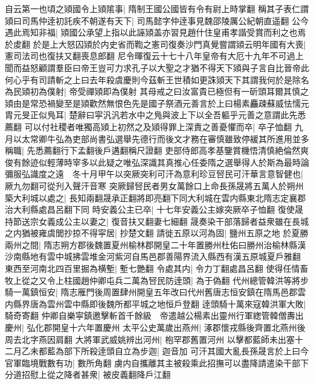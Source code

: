 自云第一也頃之熲國令上熲隂事|{
	隋制王國公國皆有令有尉上時掌翻}
稱其子表仁謂熲曰司馬仲逹初託疾不朝遂有天下|{
	司馬懿字仲逹事見魏邵陵厲公紀朝直遥翻}
公今遇此焉知非福|{
	熲國公承望上指以此誣熲盖亦習見趙什住皇甫孝諧受賞而利之也焉於䖍翻}
於是上大怒囚熲於内史省而鞫之憲司復奏沙門真覺嘗謂熲云明年國有大喪|{
	憲司法司也復扶又翻喪息郎翻}
尼令暉復云十七十八年皇帝有大厄十九年不可過上聞而益怒顧謂羣臣曰帝王豈可力求孔子以大聖之才猶不得天下熲與子言自比晉帝此何心乎有司請斬之上曰去年殺虞慶則今茲斬王世積如更誅熲天下其謂我何於是除名為民熲初為僕射|{
	帝受禪熲即為僕射}
其母戒之曰汝富貴已極但有一斫頭耳爾其慎之熲由是常恐禍變至是熲歡然無恨色先是國子祭酒元善言於上曰楊素麤疎蘇威怯懦元胄元旻正似鳬耳|{
	楚辭曰寜汎汎若水中之鳬與波上下以全吾軀乎元善之意謂此先悉薦翻}
可以付社稷者唯獨高熲上初然之及熲得罪上深責之善憂懼而卒|{
	卒子恤翻}
九月以太常卿牛弘為吏部尚書弘選舉先德行而後文才務在審慎雖致停緩其所進用並多稱職|{
	先悉薦翻行下孟翻後戶遘翻稱尺證翻}
吏部侍郎高孝基鑒賞機悟清慎絶倫然爽俊有餘迹似輕薄時宰多以此疑之唯弘深識其真推心任委隋之選舉得人於斯為最時論彌服弘識度之遠　冬十月甲午以突厥突利可汗為意利珍豆唘民可汗華言意智健也|{
	厥九勿翻可從刋入聲汗音寒}
突厥歸唘民者男女萬餘口上命長孫晟將五萬人於朔州築大利城以處之|{
	長知兩翻晟承正翻將即亮翻下同大利城在雲内縣東北隋志定襄郡治大利縣處昌呂翻下同}
時安義公主已卒|{
	十七年安義公主嫁突厥卒子恤翻}
復使晟持節送宗女義成公主以妻之|{
	復音扶又翻妻七細翻}
晟奏染干部落歸者益衆雖在長城之内猶被雍虞閭抄掠不得寜居|{
	抄楚文翻}
請徙五原以河為固|{
	鹽州五原之地}
於夏勝兩州之間|{
	隋志朔方郡後魏置夏州榆林郡開皇二十年置勝州杜佑曰勝州治榆林縣漢沙南縣地有雲中城拂雲堆金河紫河自馬邑郡善陽界流入縣西有漢五原城夏戶雅翻}
東西至河南北四百里掘為横塹|{
	塹七艷翻}
令處其内|{
	令力丁翻處昌呂翻}
使得任情畜牧上從之又令上柱國趙仲卿屯兵二萬為唘民防逹頭|{
	為于偽翻}
代州總管韓洪等將步騎一萬鎮恒安|{
	隋志雁門後周置肆州開皇五年改曰代州舊唐志恒安鎮在隋馬邑郡雲内縣界唐為雲州雲中縣即後魏所都平城之地恒戶登翻}
逹頭騎十萬來寇韓洪軍大敗|{
	騎奇寄翻}
仲卿自樂寜鎮邀擊斬首千餘級　帝遣越公楊素出靈州行軍緫管韓僧夀出慶州|{
	弘化郡開皇十六年置慶州}
太平公史萬歲出燕州|{
	涿郡懷戎縣後齊置北燕州後周去北字燕因肩翻}
大將軍武威姚辨出河州|{
	枹罕郡舊置河州}
以擊都藍師未出塞十二月乙未都藍為部下所殺逹頭自立為步迦|{
	迦音加}
可汗其國大亂長孫晟言於上曰今官軍臨境戰數有功|{
	數所角翻}
虜内自攜離其主被殺乘此招撫可以盡降請遣染干部下分道招慰上從之降者甚衆|{
	被皮義翻降戶江翻}


